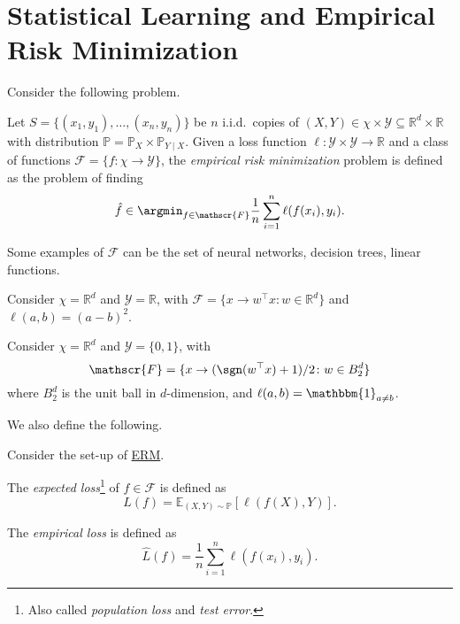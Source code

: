 \section{Statistical Learning and Empirical Risk Minimization}
Consider the following problem.

\begin{problem}\label{prb:ERM}
Let \(S = \{ (x_1, y_1) , \dots , (x_n, y_n)\} \) be \(n\) i.i.d.\ copies of \((X, Y) \in \chi \times \mathcal{Y} \subseteq \mathbb{R} ^d\times \mathbb{R}\) with distribution \(\mathbb{P} = \mathbb{P} _X \times \mathbb{P} _{Y \mid X}\). Given a loss function \(\ell \colon \mathcal{Y} \times \mathcal{Y} \to \mathbb{R}\) and a class of functions \(\mathscr{F} = \{ f\colon \chi \to \mathcal{Y}  \} \), the \emph{empirical risk minimization} problem is defined as the problem of finding
\[
	\hat{f} \in \argmin_{f\in \mathscr{F} } \frac{1}{n}\sum_{i=1}^{n} \ell (f(x_i), y_i).
\]
\end{problem}

\begin{eg}
	Some examples of \(\mathscr{F} \) can be the set of neural networks, decision trees, linear functions.
\end{eg}

\begin{eg}
	Consider \(\chi = \mathbb{R} ^d\) and \(\mathcal{Y} = \mathbb{R} \), with \(\mathscr{F} = \{ x \to w^{\top} x \colon w\in \mathbb{R} ^d \} \) and \(\ell (a, b) = (a - b)^2\).
\end{eg}

\begin{eg}
	Consider \(\chi = \mathbb{R} ^d\) and \(\mathcal{Y} = \{ 0, 1 \} \), with
	\[
		\mathscr{F} = \{ x \to (\sgn (w^{\top} x ) + 1)/ 2 \colon w\in B_2^d \}
	\]
	where \(B_2^d\) is the unit ball in \(d\)-dimension, and \(\ell (a, b) = \mathbbm{1}_{a \neq b} \).
\end{eg}

We also define the following.

\begin{definition*}
	Consider the set-up of \hyperref[prb:ERM]{ERM}.
	\begin{definition}\label{def:expected-loss}
		The \emph{expected loss}\footnote{Also called \emph{population loss} and \emph{test error}.} of \(f\in \mathscr{F} \) is defined as
		\[
			L(f) = \mathbb{E}_{(X, Y) \sim \mathbb{P} }\left[\ell (f(X), Y) \right].
		\]
	\end{definition}

	\begin{definition}\label{def:empirical-loss}
		The \emph{empirical loss} is defined as
		\[
			\hat{L} (f) = \frac{1}{n}\sum_{i=1}^{n} \ell (f(x_i), y_i).
		\]
	\end{definition}
\end{definition*}

